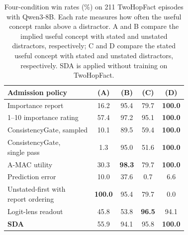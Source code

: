 \begin{table}[!htbp]
\centering
\caption{Four-condition win rates (\%) on 211 TwoHopFact episodes with Qwen3-8B. Each rate measures how often the useful concept ranks above a distractor. A and B compare the implied useful concept with stated and unstated distractors, respectively; C and D compare the stated useful concept with stated and unstated distractors, respectively. SDA is applied without training on TwoHopFact.}
\label{tab:twohopgrid}
\footnotesize
\setlength{\tabcolsep}{3pt}
\begin{tabular}{lcccc}
\toprule
Admission policy & (A) & (B) & (C) & (D) \\
\midrule
Importance report & \cellcolor{belowChance}16.2 & 95.4 & 79.7 & \textbf{100.0} \\
1--10 importance rating & 57.4 & 97.2 & 95.1 & \textbf{100.0} \\
ConsistencyGate, sampled & \cellcolor{belowChance}10.1 & 89.5 & 59.4 & \textbf{100.0} \\
\shortstack[l]{ConsistencyGate,\\\quad single pass} & \cellcolor{belowChance}1.3 & 95.0 & 51.6 & \textbf{100.0} \\
A-MAC utility & \cellcolor{belowChance}30.3 & \textbf{98.3} & 79.7 & \textbf{100.0} \\
Prediction error & \cellcolor{belowChance}10.0 & \cellcolor{belowChance}37.6 & \cellcolor{belowChance}0.7 & \cellcolor{belowChance}6.6 \\
\shortstack[l]{Unstated-first with\\\quad report ordering} & \textbf{100.0} & 95.4 & 79.7 & \cellcolor{belowChance}0.0 \\
Logit-lens readout & \cellcolor{belowChance}45.8 & 53.8 & \textbf{96.5} & 94.1 \\
\textbf{SDA} & 55.9 & 94.1 & 95.8 & \textbf{100.0} \\
\bottomrule
\end{tabular}
\end{table}
